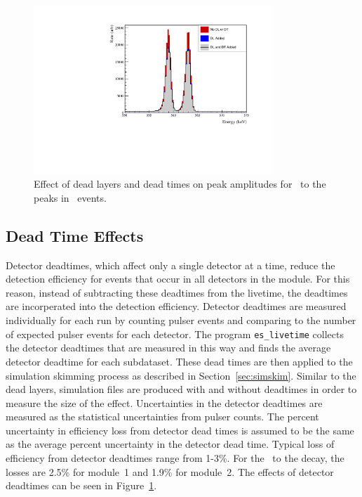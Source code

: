 \documentclass[/main.tex]{subfiles}
\begin{document}
\begin{figure}
  \centering
  \includegraphics[width=0.8\textwidth]{DeadLayerDeadTime}
  \caption[Simulated effect of dead layers and dead times]{\label{fig:dldt}
    Effect of dead layers and dead times on peak amplitudes for \tnbb\ to the  peaks in \msmd\ events.
  }
\end{figure}

\subsection{Dead Time Effects} \label{sec:DT}
Detector deadtimes, which affect only a single detector at a time, reduce the detection efficiency for events that occur in all detectors in the module.
For this reason, instead of subtracting these deadtimes from the livetime, the deadtimes are incorperated into the detection efficiency.
Detector deadtimes are measured individually for each run by counting pulser events and comparing to the number of expected pulser events for each detector.
The program \texttt{es\_livetime} collects the detector deadtimes that are measured in this way and finds the average detector deadtime for each subdataset.
These dead times are then applied to the simulation skimming process as described in Section~\ref{sec:simskim}.
Similar to the dead layers, simulation files are produced with and without deadtimes in order to measure the size of the effect.
Uncertainties in the detector deadtimes are measured as the statistical uncertainties from pulser counts.
The percent uncertainty in efficiency loss from detector dead times is assumed to be the same as the average percent uncertainty in the detector dead time.
Typical loss of efficiency from detector deadtimes range from 1-3\%.
For the \tnbb\ to the  decay, the losses are 2.5\% for module~1 and 1.9\% for module~2.
The effects of detector deadtimes can be seen in Figure~\ref{fig:dldt}.
\end{document}
